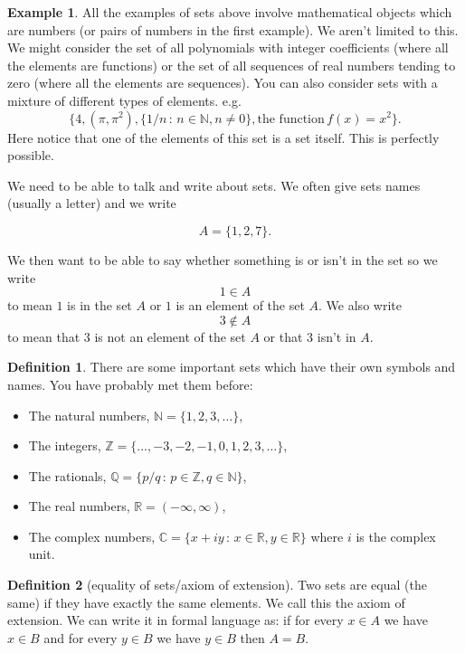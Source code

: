 \documentclass[
]{book}
\theoremstyle{definition}
\newtheorem{definition}{Definition}[chapter]
\theoremstyle{definition}
\newtheorem{example}{Example}[chapter]
\theoremstyle{definition}
\theoremstyle{definition}
\theoremstyle{remark}
\begin{document}
\begin{example}
All the examples of sets above involve mathematical objects which are numbers (or pairs of numbers in the first example). We aren't limited to this. We might consider the set of all polynomials with integer coefficients (where all the elements are functions) or the set of all sequences of real numbers tending to zero (where all the elements are sequences). You can also consider sets with a mixture of different types of elements. e.g.~
\[ \{ 4, (\pi, \pi^2), \{1/n \,:\, n \in \mathbb{N}, n \neq 0 \}, \mbox{the function}\, f(x) = x^2\}.  \] Here notice that one of the elements of this set is a set itself. This is perfectly possible.
\end{example}

We need to be able to talk and write about sets. We often give sets names (usually a letter) and we write

\[ A = \{1,2,7\}.  \]

We then want to be able to say whether something is or isn't in the set so we write
\[ 1 \in A  \] to mean \(1\) is in the set \(A\) or \(1\) is an element of the set \(A\). We also write
\[ 3 \notin A \] to mean that \(3\) is not an element of the set \(A\) or that 3 isn't in \(A\).

\begin{definition}

There are some important sets which have their own symbols and names. You have probably met them before:

\begin{itemize}
\item
  The natural numbers, \(\mathbb{N}= \{1,2,3,\dots\}\),
\item
  The integers, \(\mathbb{Z} = \{ \dots, -3, -2, -1, 0, 1, 2, 3, \dots \}\),
\item
  The rationals, \(\mathbb{Q} = \{p/q \,:\, p \in \mathbb{Z}, q \in \mathbb{N}\}\),
\item
  The real numbers, \(\mathbb{R} = (-\infty, \infty)\),
\item
  The complex numbers, \(\mathbb{C} = \{x+iy \,:\, x \in \mathbb{R}, y \in \mathbb{R}\}\) where \(i\) is the complex unit.
\end{itemize}

\end{definition}

\begin{definition}[equality of sets/axiom of extension]
Two sets are equal (the same) if they have exactly the same elements. We call this the axiom of extension. We can write it in formal language as: if for every \(x \in A\) we have \(x \in B\) and for every \(y \in B\) we have \(y \in B\) then \(A=B\).
\end{definition}
\end{document}

